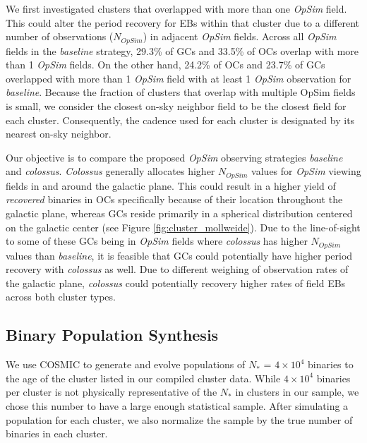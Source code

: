 \documentclass[twocolumn]{aastex63}
\begin{document}
We first investigated clusters that overlapped with more than one \textit{OpSim} field. This could alter the period recovery for EBs within that cluster due to a different number of observations ($N_{\textit{OpSim}}$) in adjacent \textit{OpSim} fields. Across all \textit{OpSim} fields in the \textit{baseline} strategy, 29.3\% of GCs and 33.5\% of OCs overlap with more than 1 \textit{OpSim} fields. On the other hand, 24.2\% of OCs and 23.7\% of GCs overlapped with more than 1 \textit{OpSim} field with at least 1 \textit{OpSim} observation for \textit{baseline}. Because the fraction of clusters that overlap with multiple OpSim fields is small, we consider the closest on-sky neighbor field to be the closest field for each cluster. Consequently, the cadence used for each cluster is designated by its nearest on-sky neighbor.

Our objective is to compare the proposed \textit{OpSim} observing strategies \textit{baseline} and \textit{colossus}. \textit{Colossus} generally allocates higher $N_{\textit{OpSim}}$ values for \textit{OpSim} viewing fields in and around the galactic plane. This could result in a higher yield of \textit{recovered} binaries in OCs specifically because of their location throughout the galactic plane, whereas GCs reside primarily in a spherical distribution centered on the galactic center (see Figure \ref{fig:cluster_mollweide}). Due to the line-of-sight to some of these GCs being in \textit{OpSim} fields where \textit{colossus} has higher $N_{\textit{OpSim}}$ values than \textit{baseline}, it is feasible that GCs could potentially have higher period recovery with \textit{colossus} as well. Due to different weighing of observation rates of the galactic plane, \textit{colossus} could potentially recovery higher rates of field EBs across both cluster types.


\subsection{Binary Population Synthesis} \label{subsec:cosmic}
We use COSMIC \citep{2018PhDT........74B} to generate and evolve populations of $N_{*}$ = $4 \times 10^4$ binaries to the age of the cluster listed in our compiled cluster data. While $4 \times 10^4$ binaries per cluster is not physically representative of the $N_{*}$ in  clusters in our sample, we chose this number to have a large enough statistical sample. After simulating a population for each cluster, we also normalize the sample by the true number of binaries in  each cluster. 
\end{document}
